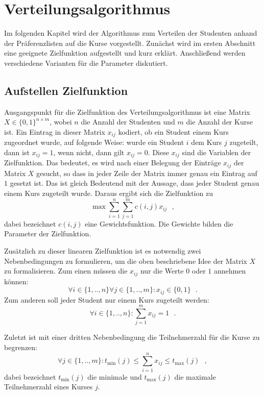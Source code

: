 \chapter{Verteilungsalgorithmus}
\label{chapter:algorithm}
    Im folgenden Kapitel wird der Algorithmus zum Verteilen der Studenten anhand der Präferenzlisten auf die Kurse vorgestellt.
    Zunächst wird im ersten Abschnitt eine geeignete Zielfunktion aufgestellt und kurz erklärt.
    Anschließend werden verschiedene Varianten für die Parameter diskutiert.
    \section{Aufstellen Zielfunktion}
        Ausgangspunkt für die Zielfunktion des Verteilungsalgorithmus ist eine Matrix $ X \in \{0,1\}^{n \times m}$, wobei $ n $ die Anzahl der Studenten und $ m $ die Anzahl der Kurse ist.
        Ein Eintrag in dieser Matrix $ x_{ij} $ kodiert, ob ein Student einem Kurs zugeordnet wurde, auf folgende Weise:
        wurde ein Student $ i $ dem Kurs $ j $ zugeteilt, dann ist $ x_{ij} = 1 $, wenn nicht, dann gilt $ x_{ij} = 0 $. 
        Diese $ x_{ij} $ sind die Variablen der Zielfunktion.
        Das bedeutet, es wird nach einer Belegung der Einträge $ x_{ij} $ der Matrix $ X $ gesucht, so dass in jeder Zeile der Matrix immer genau ein Eintrag auf $ 1 $ gesetzt ist.
        Das ist gleich Bedeutend mit der Aussage, dass jeder Student genau einem Kurs zugeteilt wurde.
        Daraus ergibt sich die Zielfunktion zu
            $$ \max \sum_{i=1}^{n} \sum_{j=1}^{m} c(i,j)x_{ij}  ~~~,$$
        dabei bezeichnet $ c(i,j) $ eine Gewichtsfunktion.
        Die Gewichte bilden die Parameter der Zielfunktion.
        
        Zusätzlich zu dieser linearen Zielfunktion ist es notwendig zwei Nebenbedingungen zu formulieren, um die oben beschriebene Idee der Matrix $ X $ zu formalisieren.
        Zum einen müssen die $ x_{ij} $ nur die Werte $ 0 $ oder $ 1 $ annehmen können:
            $$\forall {i \in \{1,..,n\}} \forall {j \in \{1,..,m\}}:  x_{ij} \in \{0,1\} ~~~.$$
        Zum anderen soll jeder Student nur einem Kurs zugeteilt werden:
            $$ \forall {i \in \{1,..,n\}}: \sum_{j=1}^{m} x_{ij} = 1 ~~~.$$
        
        Zuletzt ist mit einer dritten Nebenbedingung die Teilnehmerzahl für die Kurse zu begrenzen:
             $$ \forall {j \in \{1,..,m\}}: t_{\min}(j) \leq \sum_{i=1}^{n} x_{ij} \leq t_{\max}(j) ~~~,$$
        dabei bezeichnet $ t_{\min}(j) $ die minimale und $ t_{\max}(j) $ die maximale Teilnehmerzahl eines Kurses $ j $.
        
